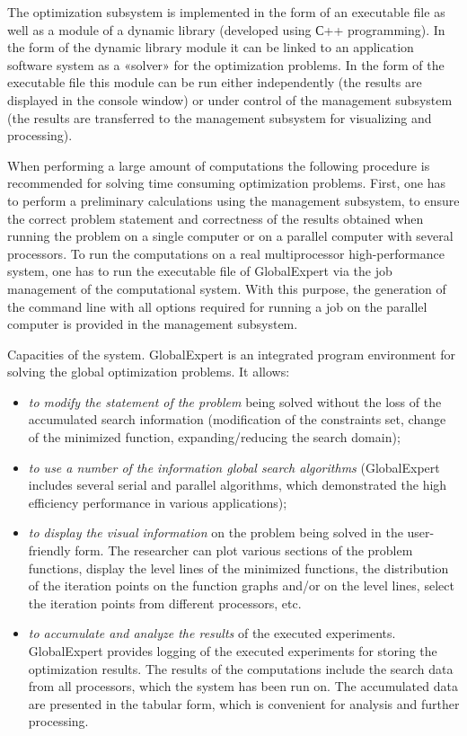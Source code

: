 The optimization subsystem is implemented in the form of an executable file as well as a module of a dynamic library (developed using С++ programming). In the form of the dynamic library module it can be linked to an application software system as a «solver» for the optimization problems. In the form of the executable file this module can be run either independently (the results are displayed in the console window) or under control of the management subsystem (the results are transferred to the management subsystem for visualizing and processing). 

When performing a large amount of computations the following procedure is recommended for solving time consuming optimization problems. First, one has to perform a preliminary calculations using the management subsystem, to ensure the correct problem statement and correctness of the results obtained when running the problem on a single computer or on a parallel computer with several processors. To run the computations on a real multiprocessor high-performance system, one has to run the executable file of GlobalExpert via the job management of the computational system. With this purpose, the generation of the command line with all options required for running a job on the parallel computer is provided in the management subsystem.

Capacities of the system. GlobalExpert is an integrated program environment for solving the global optimization problems. It allows: 

\begin{itemize}
\item \textit{to modify the statement of the problem} being solved without the loss of the accumulated search information (modification of the constraints set, change of the minimized function, expanding/reducing the search domain);

\item \textit{to use a number of the information global search algorithms} (GlobalExpert includes several serial and parallel algorithms, which demonstrated the high efficiency performance in various applications);

\item \textit{to display the visual information} on the problem being solved in the user-friendly form. The researcher can plot various sections of the problem functions, display the level lines of the minimized functions, the distribution of the iteration points on the function graphs and/or on the level lines, select the iteration points from different processors, etc. 

\item \textit{to accumulate and analyze the results} of the executed experiments. GlobalExpert provides logging of the executed experiments for storing the optimization results. The results of the computations include the search data from all processors, which the system has been run on. The accumulated data are presented in the tabular form, which is convenient for analysis and further processing. 
\end{itemize}




